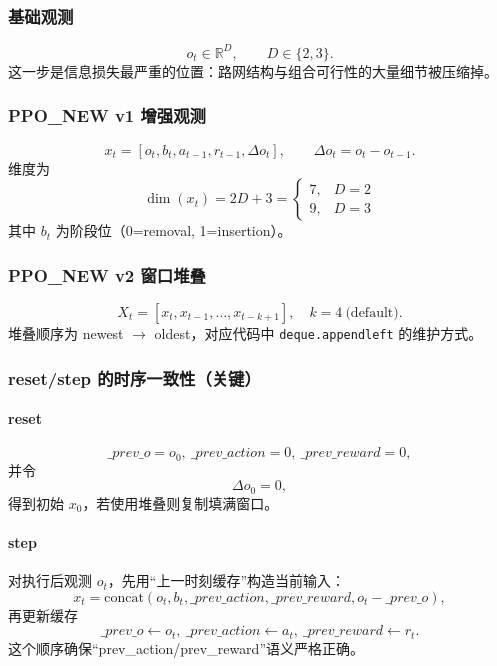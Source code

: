 ﻿\documentclass[11pt,a4paper]{ctexart}
\begin{document}
\subsubsection{基础观测}
\begin{equation}
o_t\in\mathbb{R}^D,\qquad D\in\{2,3\}.
\end{equation}
这一步是信息损失最严重的位置：路网结构与组合可行性的大量细节被压缩掉。

\subsubsection{PPO\_NEW v1 增强观测}
\begin{equation}
x_t=[o_t,b_t,a_{t-1},r_{t-1},\Delta o_t],\qquad \Delta o_t=o_t-o_{t-1}.
\end{equation}
维度为
\begin{equation}
\dim(x_t)=2D+3=
\begin{cases}
7,&D=2\\
9,&D=3
\end{cases}
\end{equation}
其中 $b_t$ 为阶段位（0=removal, 1=insertion）。

\subsubsection{PPO\_NEW v2 窗口堆叠}
\begin{equation}
X_t=[x_t,x_{t-1},\ldots,x_{t-k+1}],\quad k=4\ \text{(default)}.
\end{equation}
堆叠顺序为 newest $\rightarrow$ oldest，对应代码中 \texttt{deque.appendleft} 的维护方式。

\subsubsection{reset/step 的时序一致性（关键）}
\paragraph{reset}
\begin{equation}
\_prev\_o=o_0,\ \_prev\_action=0,\ \_prev\_reward=0,
\end{equation}
并令
\begin{equation}
\Delta o_0=0,
\end{equation}
得到初始 $x_0$，若使用堆叠则复制填满窗口。

\paragraph{step}
对执行后观测 $o_t$，先用“上一时刻缓存”构造当前输入：
\begin{equation}
x_t=\mathrm{concat}(o_t,b_t,\_prev\_action,\_prev\_reward,o_t-\_prev\_o),
\end{equation}
再更新缓存
\begin{equation}
\_prev\_o\leftarrow o_t,\ \_prev\_action\leftarrow a_t,\ \_prev\_reward\leftarrow r_t.
\end{equation}
这个顺序确保“prev\_action/prev\_reward”语义严格正确。
\end{document}

